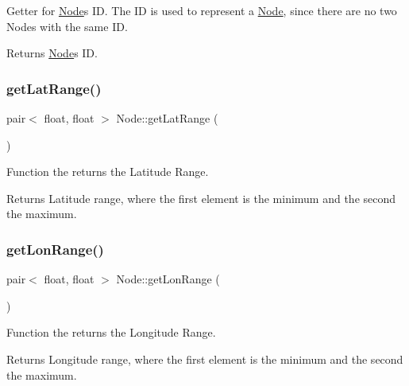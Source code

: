 Getter for \hyperlink{class_node}{Node}\textquotesingle{}s ID. The ID is used to represent a \hyperlink{class_node}{Node}, since there are no two Nodes with the same ID.

\begin{DoxyReturn}{Returns}
\hyperlink{class_node}{Node}\textquotesingle{}s ID. 
\end{DoxyReturn}
\hypertarget{class_node_a258af43995af26e3ce9401bdd4948b30}{}\label{class_node_a258af43995af26e3ce9401bdd4948b30} 
\subsubsection{\texorpdfstring{get\+Lat\+Range()}{getLatRange()}}
{\footnotesize\ttfamily pair$<$ float, float $>$ Node\+::get\+Lat\+Range (\begin{DoxyParamCaption}{ }\end{DoxyParamCaption})\hspace{0.3cm}{\ttfamily [static]}}

Function the returns the Latitude Range.

\begin{DoxyReturn}{Returns}
Latitude range, where the first element is the minimum and the second the maximum. 
\end{DoxyReturn}
\hypertarget{class_node_a8533c4ac90cb7bc99895546b161e7d5a}{}\label{class_node_a8533c4ac90cb7bc99895546b161e7d5a} 
\subsubsection{\texorpdfstring{get\+Lon\+Range()}{getLonRange()}}
{\footnotesize\ttfamily pair$<$ float, float $>$ Node\+::get\+Lon\+Range (\begin{DoxyParamCaption}{ }\end{DoxyParamCaption})\hspace{0.3cm}{\ttfamily [static]}}

Function the returns the Longitude Range.

\begin{DoxyReturn}{Returns}
Longitude range, where the first element is the minimum and the second the maximum. 
\end{DoxyReturn}
\hypertarget{class_node_abc4a69053f8f664c9b6a6a6bbe5d8c68}{}\label{class_node_abc4a69053f8f664c9b6a6a6bbe5d8c68} 

